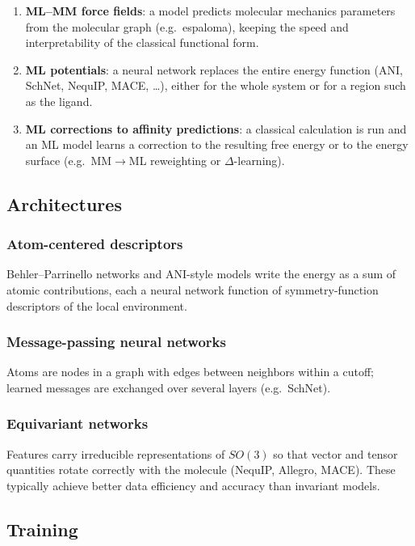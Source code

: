 \documentclass[english,course]{lecture}
\begin{document}
\begin{enumerate}
    \item \textbf{ML--MM force fields}: a model predicts molecular mechanics parameters from the molecular graph (e.g.\ espaloma), keeping the speed and interpretability of the classical functional form.
    \item \textbf{ML potentials}: a neural network replaces the entire energy function (ANI, SchNet, NequIP, MACE, \ldots), either for the whole system or for a region such as the ligand.
    \item \textbf{ML corrections to affinity predictions}: a classical calculation is run and an ML model learns a correction to the resulting free energy or to the energy surface (e.g.\ MM$\to$ML reweighting or $\Delta$-learning).
\end{enumerate}


\subsection{Architectures}

\subsubsection*{Atom-centered descriptors}
Behler--Parrinello networks and ANI-style models write the energy as a sum of atomic contributions, each a neural network function of symmetry-function descriptors of the local environment.

\subsubsection*{Message-passing neural networks}
Atoms are nodes in a graph with edges between neighbors within a cutoff; learned messages are exchanged over several layers (e.g.\ SchNet).

\subsubsection*{Equivariant networks}
Features carry irreducible representations of $SO(3)$ so that vector and tensor quantities rotate correctly with the molecule (NequIP, Allegro, MACE). These typically achieve better data efficiency and accuracy than invariant models.

\subsection{Training}
\end{document}

